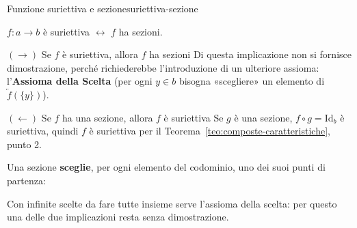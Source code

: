 \begin{concetto}
\begin{Teorema}{Funzione suriettiva e sezione}{suriettiva-sezione}
    \begin{prerequisiti}
    \end{prerequisiti}
    $f \colon a \to b$ è suriettiva $\leftrightarrow$ $f$ ha sezioni.
\end{Teorema}
\begin{dimostrazione}
    \begin{caso}{$(\rightarrow)$ Se $f$ è suriettiva, allora $f$ ha sezioni}
        Di questa implicazione non si fornisce dimostrazione, perché richiederebbe l'introduzione di un ulteriore
        assioma: l'\textbf{Assioma della Scelta} (per ogni $y \in b$ bisogna «scegliere» un elemento di $\overleftarrow{f}(\{y\})$).
    \end{caso}
    \begin{caso}{$(\leftarrow)$ Se $f$ ha una sezione, allora $f$ è suriettiva}
        Se $g$ è una sezione, $f \circ g = \mathrm{Id}_b$ è suriettiva, quindi $f$ è suriettiva per il
        Teorema~\ref{teo:composte-caratteristiche}, punto 2.
    \end{caso}
\end{dimostrazione}
\end{concetto}

\begin{spiegazione}
    Una sezione \textbf{sceglie}, per ogni elemento del codominio, uno dei suoi punti di partenza:
    \begin{center}
    \end{center}
    Con infinite scelte da fare tutte insieme serve l'assioma della scelta: per questo una delle due implicazioni resta senza dimostrazione.
\end{spiegazione}


